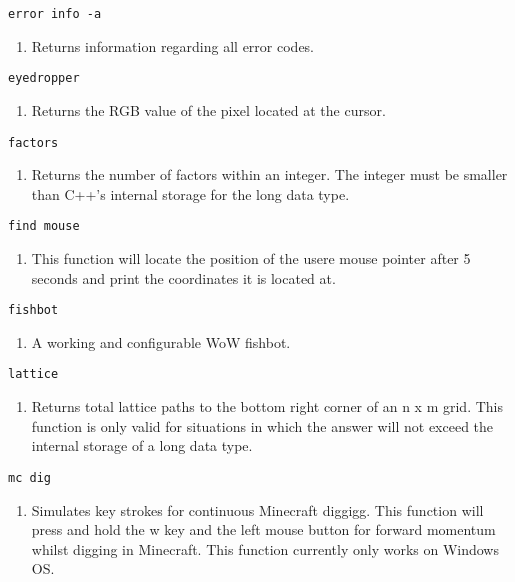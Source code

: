 \begin{lstlisting} 
error info -a
\end{lstlisting}
\begin{enumerate}
\item[] Returns information regarding all error codes.
\end{enumerate}
\begin{lstlisting} 
eyedropper
\end{lstlisting}
\begin{enumerate}
	\item[] Returns the RGB value of the pixel located at the cursor.
\end{enumerate}
\begin{lstlisting} 
factors   
\end{lstlisting}
\begin{enumerate}
	\item[] Returns the number of factors within an integer. The integer must be smaller than C++'s internal storage for the long data type.
\end{enumerate}
\begin{lstlisting} 
find mouse
\end{lstlisting}
\begin{enumerate}
	\item[] This function will locate the position of the usere mouse pointer after 5 seconds and print the coordinates it is located at.
\end{enumerate}
\begin{lstlisting} 
fishbot
\end{lstlisting}
\begin{enumerate}
\item[]  A working and configurable WoW fishbot.
\end{enumerate}
\begin{lstlisting} 
lattice   
\end{lstlisting}
\begin{enumerate}
	\item[] Returns total lattice paths to the bottom right corner of an n x m grid. This function is only valid for situations in which the answer will not exceed the internal storage of a long data type.
\end{enumerate}
\begin{lstlisting} 
mc dig
\end{lstlisting}
\begin{enumerate}
	\item[] Simulates key strokes for continuous Minecraft diggigg. This function will press and hold the w key and the left mouse button for forward momentum whilst digging in Minecraft. This function currently only works on Windows OS.
\end{enumerate}
